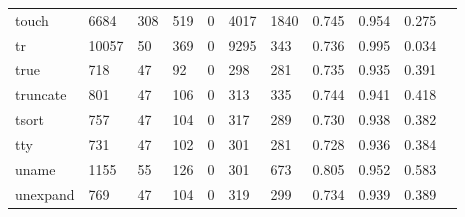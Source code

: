 \begin{longtable}{lp{1.10cm}p{1.10cm}p{1.10cm}p{1.10cm}p{1.10cm}p{1.10cm}p{1.10cm}p{1.10cm}p{1.10cm}p{1.10cm}}
touch     &                   6684 &                                308 &                               519 &                                0 &                              4017 &                            1840 &                          0.745 &                                 0.954 &                               0.275 \\
tr        &                  10057 &                                 50 &                               369 &                                0 &                              9295 &                             343 &                          0.736 &                                 0.995 &                               0.034 \\
true      &                    718 &                                 47 &                                92 &                                0 &                               298 &                             281 &                          0.735 &                                 0.935 &                               0.391 \\
truncate  &                    801 &                                 47 &                               106 &                                0 &                               313 &                             335 &                          0.744 &                                 0.941 &                               0.418 \\
tsort     &                    757 &                                 47 &                               104 &                                0 &                               317 &                             289 &                          0.730 &                                 0.938 &                               0.382 \\
tty       &                    731 &                                 47 &                               102 &                                0 &                               301 &                             281 &                          0.728 &                                 0.936 &                               0.384 \\
uname     &                   1155 &                                 55 &                               126 &                                0 &                               301 &                             673 &                          0.805 &                                 0.952 &                               0.583 \\
unexpand  &                    769 &                                 47 &                               104 &                                0 &                               319 &                             299 &                          0.734 &                                 0.939 &                               0.389 \\

\end{longtable}
